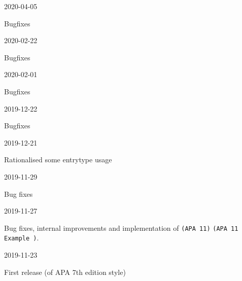 \documentclass{ltxdockit}
\newcommand\apa[2][]{\ifthenelse{\equal{#1}{}}%
                       {\texttt{(APA #2)}}%
                       {\texttt{(APA #2 Example #1)}}}
\begin{document}
\begin{changelog}
\begin{release}{9.7}{2020-04-05}
\item Bugfixes
\end{release}

\begin{release}{9.6}{2020-02-22}
\item Bugfixes
\end{release}

\begin{release}{9.5}{2020-02-01}
\item Bugfixes
\end{release}

\begin{release}{9.4}{2019-12-22}
\item Bugfixes
\end{release}

\begin{release}{9.3}{2019-12-21}
\item Rationalised some entrytype usage
\end{release}

\begin{release}{9.2}{2019-11-29}
\item Bug fixes
\end{release}
  
\begin{release}{9.1}{2019-11-27}
\item Bug fixes, internal improvements and implementation of \apa{11}.
\end{release}

\begin{release}{9.0}{2019-11-23}
\item First release (of APA 7th edition style)
\end{release}

\end{changelog}
\end{document}
